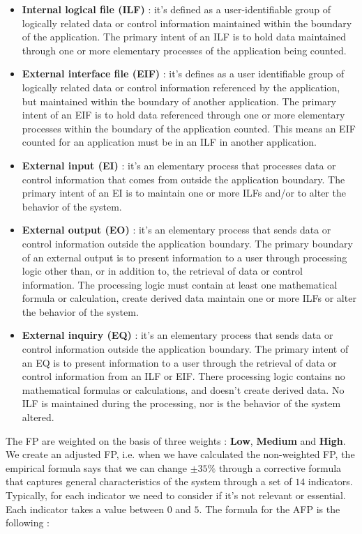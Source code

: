 \documentclass[11pt]{article}
\begin{document}
\begin{itemize}
\item \textbf{Internal logical file (ILF)} : it's defined as a user-identifiable group of logically related data or control information maintained within the boundary of the application. The primary intent of an ILF is to hold data maintained through one or more elementary processes of the application being counted.
\item \textbf{External interface file (EIF)} : it's defines as a user identifiable group of logically related data or control information referenced by the application, but maintained within the boundary of another application. The primary intent of an EIF is to hold data referenced through one or more elementary processes within the boundary of the application counted. This means an EIF counted for an application must be in an ILF in another application.
\item \textbf{External input (EI)} : it's an elementary process that processes data or control information that comes from outside the application boundary. The primary intent of an EI is to maintain one or more ILFs and/or to alter the behavior of the system.
\item \textbf{External output (EO)} : it's an elementary process that sends data or control information outside the application boundary. The primary boundary of an external output is to present information to a user through processing logic other than, or in addition to, the retrieval of data or control information. The processing logic must contain at least one mathematical formula or calculation, create derived data maintain one or more ILFs or alter the behavior of the system.
\item \textbf{External inquiry (EQ)} : it's an elementary process that sends data or control information outside the application boundary. The primary intent of an EQ is to present information to a user through the retrieval of data or control information from an ILF or EIF. There processing logic contains no mathematical formulas or calculations, and doesn't create derived data. No ILF is maintained during the processing, nor is the behavior of the system altered.
\end{itemize}
The FP are weighted on the basis of three weights : \textbf{Low}, \textbf{Medium} and \textbf{High}. We create an adjusted FP, i.e. when we have calculated the non-weighted FP, the empirical formula says that we can change $\pm 35\%$ through a corrective formula that captures general characteristics of the system through a set of $14$ indicators. Typically, for each indicator we need to consider if it's not relevant or essential. Each indicator takes a value between $0$ and $5$. The formula for the AFP is the following :
\end{document}
